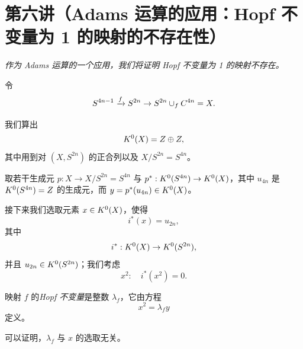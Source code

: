 \section{第六讲（Adams 运算的应用：Hopf 不变量为 1 的映射的不存在性）}

\emph{作为 Adams 运算的一个应用，我们将证明 Hopf 不变量为 1 的映射不存在。}

令
\[ S^{4n-1}\xrightarrow{f}S^{2n}\to S^{2n}\cup_f C^{4n}=X. \]

我们算出
\[  K^0(X)=Z\oplus Z, \]
其中用到对 $(X,S^{2n})$ 的正合列以及 $X/S^{2n}=S^{4n}$。

取若干生成元 $p:X\to X/S^{2n}=S^{4n}$ 与 $p^*: K^0(S^{4n})\to K^0(X)$，其中 $u_{4n}$ 是 $ K^0(S^{4n})=Z$ 的生成元，而 $y=p^*(u_{4n})\in K^0(X)$。

接下来我们选取元素 $x\in K^0(X)$，使得
\[ i^*(x)=u_{2n}, \]
其中
\[ i^*: K^0(X)\to K^0(S^{2n}), \]
并且 $u_{2n}\in K^0(S^{2n})$；我们考虑
\[ x^2:\quad i^*(x^2)=0. \]

 映射 $f$ 的\emph{Hopf 不变量}是整数 $\lambda_f$，它由方程
\[ x^2=\lambda_f y \]
定义。

可以证明，$\lambda_f$ 与 $x$ 的选取无关。



